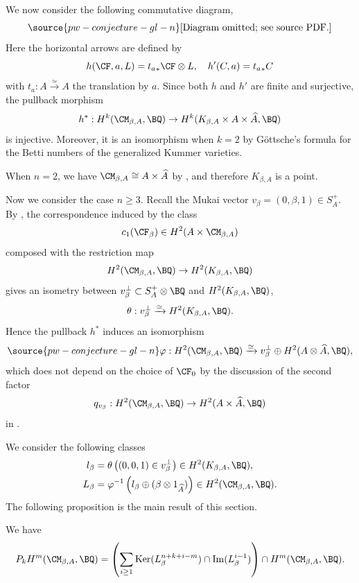 We now consider the following commutative diagram,
\begin{equation}\label{diagram1}
\source{pw-conjecture-gl-n}
    \text{[Diagram omitted; see source PDF.]}
\end{equation}
Here the horizontal arrows are defined by
\[
h(\CF, a, L) = {t_a}_* \CF \otimes  L,\quad h'(C, a)= {t_a}_\ast C
\]
with $t_a: A \xrightarrow{\simeq} A$ the translation by $a$. Since both $h$ and $h'$ are finite and surjective, the pullback morphism
\begin{equation*}
    h^*: H^k(\CM_{\beta, A}, \BQ) \to H^k(K_{\beta, A} \times A \times \widehat{A}, \BQ)
\end{equation*}
is injective. Moreover, it is an isomorphism when $k=2$ by G\"ottsche's formula \cite{Go1} for the Betti numbers of the generalized Kummer varieties.

When $n =2$, we have $\CM_{\beta,A} \cong A \times \widehat{A}$ by \cite{Yo}, and therefore $K_{\beta,A}$ is a point.

Now we consider the case $n \geq 3$. Recall the Mukai vector $v_\beta =(0,\beta ,1) \in S_A^+$. By \cite[Theorem 0.2 and (1.6)]{Yo}, the correspondence induced by the class
\[
c_1(\CF_\beta) \in H^2(A \times \CM_{\beta,A})
\]
composed with the restriction map
\[
H^2(\CM_{\beta,A}, \BQ) \to H^2(K_{\beta,A}, \BQ)
\]
gives an isometry between $v_\beta^\perp \subset S_A^+\otimes \BQ$ and $H^2(K_{\beta,A}, \BQ)$,
\[
\theta: v_\beta^\perp  \xrightarrow{\simeq}  H^2(K_{\beta,A}, \BQ).
\]
Hence the pullback $h^*$ induces an isomorphism
\begin{equation}\label{eqn39}
\source{pw-conjecture-gl-n}
\varphi: H^2(\CM_{\beta, A}, \BQ) \xrightarrow{\simeq} v_\beta^\perp \oplus H^2(A\otimes \widehat{A}, \BQ),
\end{equation}
which does not depend on the choice of $\CF_0$ by the discussion of the second factor
\[
q_{v_\beta}: H^2(\CM_{{\beta},A}, \BQ) \to H^2(A \times \widehat{A}, \BQ)
\]
in \cite[Section 8, Page 40]{Markman3}.


We consider the following classes
\[
\begin{split}
    l_\beta & = \theta\left((0,0,1)\in v_\beta^\perp\right) \in H^2(K_{\beta,A} ,\BQ), \\
    L_\beta & = \varphi^{-1} \left( l_\beta \oplus (\beta\otimes 1_{\widehat{A}}) \right) \in H^2(\CM_{\beta, A}, \BQ).
\end{split}
\]
The following proposition is the main result of this section.

\begin{prop}
\notready\label{prop2.4}
We have
\[
P_kH^m(\CM_{\beta,A}, \BQ) = \left( \sum_{i\geq 1} \mathrm{Ker}(L_\beta^{n+k+i-m}) \cap \mathrm{Im}(L_\beta^{i-1}) \right) \cap H^m(\CM_{\beta, A}, \BQ).
\]
\end{prop}


